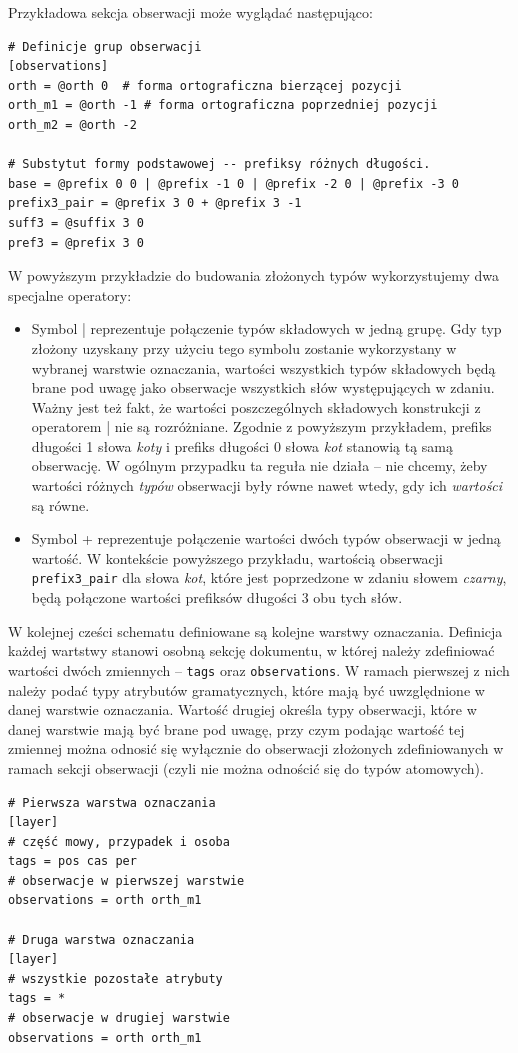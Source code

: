 \documentclass[a4paper,10]{article}
\begin{document}
Przykładowa sekcja obserwacji może wyglądać następująco:
\begin{verbatim}
# Definicje grup obserwacji
[observations]
orth = @orth 0	# forma ortograficzna bierzącej pozycji
orth_m1 = @orth -1 # forma ortograficzna poprzedniej pozycji
orth_m2 = @orth -2

# Substytut formy podstawowej -- prefiksy różnych długości.
base = @prefix 0 0 | @prefix -1 0 | @prefix -2 0 | @prefix -3 0 
prefix3_pair = @prefix 3 0 + @prefix 3 -1
suff3 = @suffix 3 0
pref3 = @prefix 3 0
\end{verbatim}
W powyższym przykładzie do budowania złożonych typów wykorzystujemy dwa specjalne
operatory:
\begin{itemize}
\item Symbol | reprezentuje połączenie typów składowych w jedną grupę.
  Gdy typ złożony uzyskany przy użyciu tego symbolu zostanie
  wykorzystany w wybranej warstwie oznaczania, wartości wszystkich typów
  składowych będą brane pod uwagę jako obserwacje wszystkich słów występujących
  w zdaniu.
  Ważny jest też fakt, że wartości poszczególnych składowych konstrukcji
  z operatorem | nie są rozróżniane. Zgodnie z powyższym przykładem,
  prefiks długości 1 słowa \emph{koty} i prefiks długości 0 słowa \emph{kot}
  stanowią tą samą obserwację. W ogólnym przypadku ta reguła nie działa
  -- nie chcemy, żeby wartości różnych \emph{typów} obserwacji były równe nawet wtedy,
  gdy ich \emph{wartości} są równe.
\item Symbol + reprezentuje połączenie wartości dwóch typów obserwacji
  w jedną wartość. W kontekście powyższego przykładu, wartością obserwacji
  \verb|prefix3_pair| dla słowa \emph{kot}, które jest poprzedzone
  w zdaniu słowem \emph{czarny}, będą połączone wartości prefiksów długości
  3 obu tych słów.
\end{itemize}

W kolejnej cześci schematu definiowane są kolejne warstwy oznaczania.
Definicja każdej wartstwy stanowi osobną sekcję dokumentu, w której należy zdefiniować
wartości dwóch zmiennych -- \verb|tags| oraz \verb|observations|.
W ramach pierwszej z nich należy podać typy atrybutów gramatycznych,
które mają być uwzględnione w danej warstwie oznaczania.
Wartość drugiej określa typy obserwacji, które w danej warstwie mają
być brane pod uwagę, przy czym podając wartość tej zmiennej można odnosić
się wyłącznie do obserwacji złożonych zdefiniowanych
w ramach sekcji obserwacji (czyli nie można odnościć się do typów atomowych).
\begin{verbatim}
# Pierwsza warstwa oznaczania
[layer]
# część mowy, przypadek i osoba
tags = pos cas per
# obserwacje w pierwszej warstwie
observations = orth orth_m1

# Druga warstwa oznaczania
[layer]
# wszystkie pozostałe atrybuty
tags = *
# obserwacje w drugiej warstwie
observations = orth orth_m1
\end{verbatim}
\end{document}
